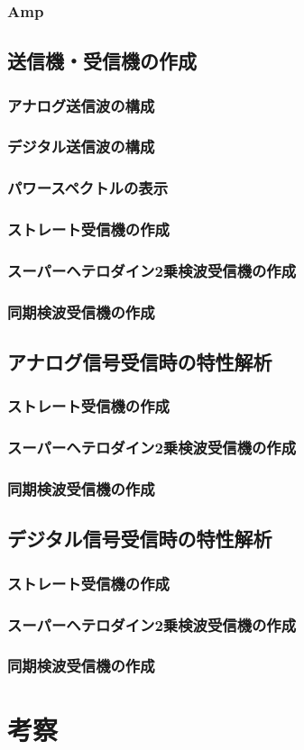 \documentclass[11pt]{ltjsarticle}
\begin{document}
		\subsubsection{Amp}
	\subsection{送信機・受信機の作成}
		\subsubsection{アナログ送信波の構成}
		\subsubsection{デジタル送信波の構成}
		\subsubsection{パワースペクトルの表示}
		\subsubsection{ストレート受信機の作成}
		\subsubsection{スーパーヘテロダイン2乗検波受信機の作成}
		\subsubsection{同期検波受信機の作成}
	\subsection{アナログ信号受信時の特性解析}
		\subsubsection{ストレート受信機の作成}
		\subsubsection{スーパーヘテロダイン2乗検波受信機の作成}
		\subsubsection{同期検波受信機の作成}
	\subsection{デジタル信号受信時の特性解析}
		\subsubsection{ストレート受信機の作成}
		\subsubsection{スーパーヘテロダイン2乗検波受信機の作成}
		\subsubsection{同期検波受信機の作成}
\section{考察} %
\end{document}
